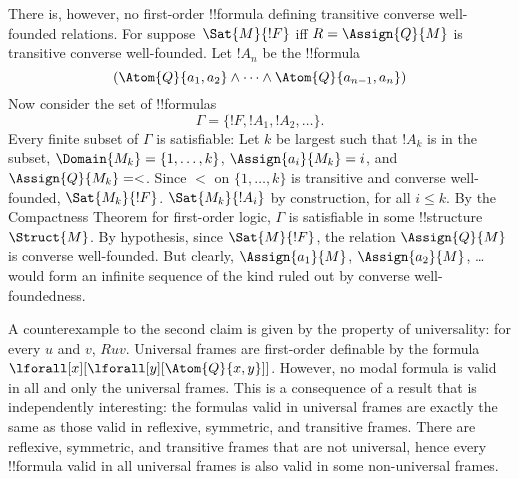 \documentclass[../../../include/open-logic-section]{subfiles}
\begin{document}
There is, however, no first-order !!{formula} defining transitive
converse well-founded relations. For suppose~$\Sat{M}{!F}$ iff $R =
\Assign{Q}{M}$ is transitive converse well-founded. Let $!A_n$ be the
!!{formula}
\[
(\Atom{Q}{a_1,a_2} \land \dots \land
    \Atom{Q}{a_{n-1},a_{n}})
\]
Now consider the set of !!{formula}s
\[
\Gamma = \{!F, !A_1, !A_2, \dots\}.
\]
Every finite subset of $\Gamma$ is satisfiable: Let $k$ be largest
such that $!A_k$ is in the subset, $\Domain{M_k} = \{1, \dots, k\}$,
$\Assign{a_i}{M_k} = i$, and $\Assign{Q}{M_k} = <$. Since $<$ on $\{1,
\dots, k\}$ is transitive and converse well-founded,
$\Sat{M_k}{!F}$. $\Sat{M_k}{!A_i}$ by construction, for all $i \le k$.
By the Compactness Theorem for first-order logic, $\Gamma$ is
satisfiable in some !!{structure}~$\Struct{M}$. By hypothesis, since
$\Sat{M}{!F}$, the relation $\Assign{Q}{M}$ is converse
well-founded. But clearly, $\Assign{a_1}{M}$, $\Assign{a_2}{M}$,
\dots{} would form an infinite sequence of the kind ruled out by
converse well-foundedness.

A counterexample to the second claim is given by the property of
universality: for every $u$ and $v$, $Ruv$. Universal frames are
first-order definable by the formula
$\lforall[x][\lforall[y][\Atom{Q}{x,y}]]$.  However, no modal formula
is valid in all and only the universal frames. This is a consequence
of a result that is independently interesting: the formulas valid in
universal frames are exactly the same as those valid in reflexive,
symmetric, and transitive frames. There are reflexive, symmetric, and
transitive frames that are not universal, hence every !!{formula}
valid in all universal frames is also valid in some non-universal
frames.
\end{document}
